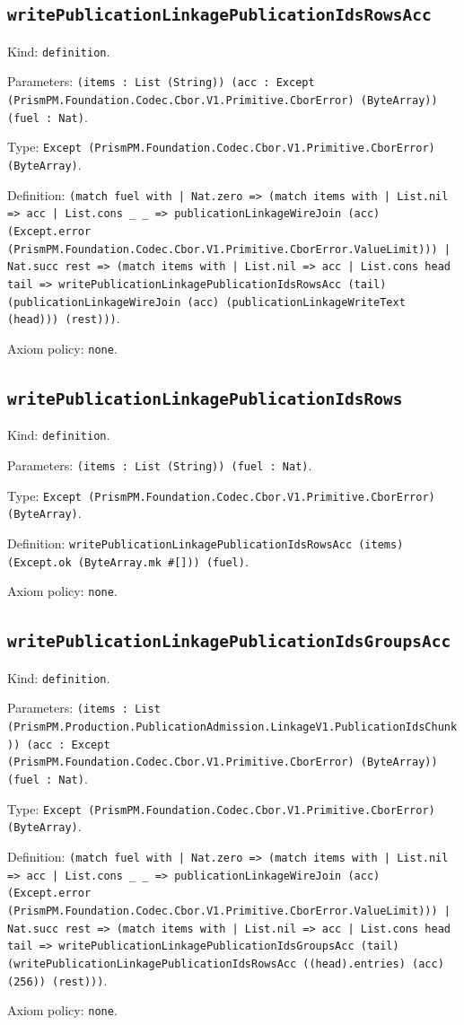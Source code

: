 \documentclass[11pt]{article}
\begin{document}
\subsection*{\texttt{writePublicationLinkagePublicationIdsRowsAcc}}
\noindent Kind: \texttt{definition}.\par
\noindent Parameters: \texttt{(items : List (String)) (acc : Except (PrismPM.Foundation.Codec.Cbor.V1.Primitive.CborError) (ByteArray)) (fuel : Nat)}.\par
\noindent Type: \texttt{Except (PrismPM.Foundation.Codec.Cbor.V1.Primitive.CborError) (ByteArray)}.\par
\noindent Definition: \texttt{(match fuel with | Nat.zero => (match items with | List.nil => acc | List.cons \_ \_ => publicationLinkageWireJoin (acc) (Except.error (PrismPM.Foundation.Codec.Cbor.V1.Primitive.CborError.ValueLimit))) | Nat.succ rest => (match items with | List.nil => acc | List.cons head tail => writePublicationLinkagePublicationIdsRowsAcc (tail) (publicationLinkageWireJoin (acc) (publicationLinkageWriteText (head))) (rest)))}.\par
\noindent Axiom policy: \texttt{none}.\par
\subsection*{\texttt{writePublicationLinkagePublicationIdsRows}}
\noindent Kind: \texttt{definition}.\par
\noindent Parameters: \texttt{(items : List (String)) (fuel : Nat)}.\par
\noindent Type: \texttt{Except (PrismPM.Foundation.Codec.Cbor.V1.Primitive.CborError) (ByteArray)}.\par
\noindent Definition: \texttt{writePublicationLinkagePublicationIdsRowsAcc (items) (Except.ok (ByteArray.mk \#[])) (fuel)}.\par
\noindent Axiom policy: \texttt{none}.\par
\subsection*{\texttt{writePublicationLinkagePublicationIdsGroupsAcc}}
\noindent Kind: \texttt{definition}.\par
\noindent Parameters: \texttt{(items : List (PrismPM.Production.PublicationAdmission.LinkageV1.PublicationIdsChunk)) (acc : Except (PrismPM.Foundation.Codec.Cbor.V1.Primitive.CborError) (ByteArray)) (fuel : Nat)}.\par
\noindent Type: \texttt{Except (PrismPM.Foundation.Codec.Cbor.V1.Primitive.CborError) (ByteArray)}.\par
\noindent Definition: \texttt{(match fuel with | Nat.zero => (match items with | List.nil => acc | List.cons \_ \_ => publicationLinkageWireJoin (acc) (Except.error (PrismPM.Foundation.Codec.Cbor.V1.Primitive.CborError.ValueLimit))) | Nat.succ rest => (match items with | List.nil => acc | List.cons head tail => writePublicationLinkagePublicationIdsGroupsAcc (tail) (writePublicationLinkagePublicationIdsRowsAcc ((head).entries) (acc) (256)) (rest)))}.\par
\noindent Axiom policy: \texttt{none}.\par
\end{document}
